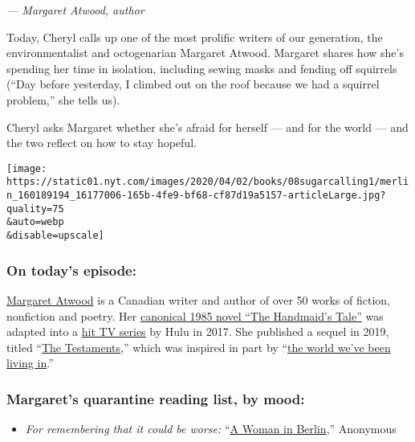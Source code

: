 \emph{--- Margaret Atwood, author}

Today, Cheryl calls up one of the most prolific writers of our
generation, the environmentalist and octogenarian Margaret Atwood.
Margaret shares how she's spending her time in isolation, including
sewing masks and fending off squirrels (``Day before yesterday, I
climbed out on the roof because we had a squirrel problem,'' she tells
us).

Cheryl asks Margaret whether she's afraid for herself --- and for the
world --- and the two reflect on how to stay hopeful.

\texttt{[image: https://static01.nyt.com/images/2020/04/02/books/08sugarcalling1/merlin\_160189194\_16177006-165b-4fe9-bf68-cf87d19a5157-articleLarge.jpg?quality=75\\\&auto=webp\\\&disable=upscale]}

\hypertarget{on-todays-episode}{%
\subsubsection{\texorpdfstring{\textbf{On today's
episode:}}{On today's episode:}}\label{on-todays-episode}}

\href{http://margaretatwood.ca/}{Margaret Atwood} is a Canadian writer
and author of over 50 works of fiction, nonfiction and poetry. Her
\href{https://www.nytimes.com/2017/03/10/books/review/margaret-atwood-handmaids-tale-age-of-trump.html}{canonical
1985 novel ``The Handmaid's Tale''} was adapted into a
\href{https://www.nytimes.com/2017/04/24/arts/television/review-the-handmaids-tale-creates-a-chilling-mans-world.html?module=inline}{hit
TV series} by Hulu in 2017. She published a sequel in 2019, titled
``\href{https://www.nytimes.com/2019/09/03/books/review/testaments-margaret-atwood-handmaids-tale.html}{The
Testaments},'' which was inspired in part by
``\href{https://www.nytimes.com/2018/11/28/books/margaret-atwood-sequel-handmaids-tale-testaments.html}{the
world we've been living in}.''

\hypertarget{margarets-quarantine-reading-list-by-mood}{%
\subsubsection{\texorpdfstring{\textbf{Margaret's quarantine reading
list, by
mood:}}{Margaret's quarantine reading list, by mood:}}\label{margarets-quarantine-reading-list-by-mood}}

\begin{itemize}
\tightlist
\item
  \emph{For remembering that it could be worse:}
  ``\href{https://www.amazon.com/Woman-Berlin/dp/1844081117}{A Woman in
  Berlin},'' Anonymous
\end{itemize}

